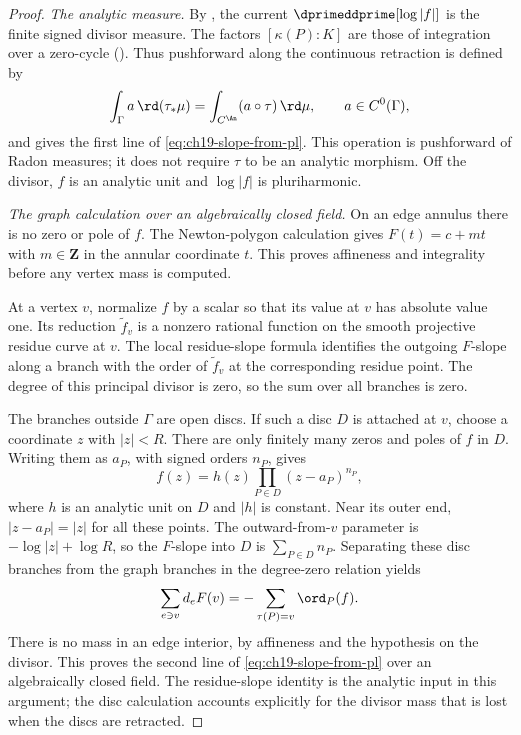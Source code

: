 \begin{proof}
\emph{The analytic measure.}
By , the current
$\dprimeddprime[\log|f|]$ is the finite signed divisor measure.
The factors $[\kappa(P):K]$ are those of integration over a
zero-cycle ().
Thus pushforward along the continuous retraction is defined by
\[
             \int_\Gamma a\,\rd(\tau_*\mu)
                  =\int_{C^{\An}}(a\circ\tau)\,\rd\mu,
             \qquad a\in C^0(\Gamma),
\]
and gives the first line of \eqref{eq:ch19-slope-from-pl}.
This operation is pushforward of Radon measures; it does not require
$\tau$ to be an analytic morphism.
Off the divisor, $f$ is an analytic unit and $\log|f|$ is
pluriharmonic.

\emph{The graph calculation over an algebraically closed field.}
On an edge annulus there is no zero or pole of $f$.
The Newton-polygon calculation
\cite[Proposition~2.10]{BPR13Structure} gives
$F(t)=c+mt$ with $m\in\mathbf Z$ in the annular coordinate $t$.
This proves affineness and integrality before any vertex mass is
computed.

At a vertex $v$, normalize $f$ by a scalar so that its value at $v$
has absolute value one.  Its reduction $\widetilde f_v$ is a
nonzero rational function on the smooth projective residue curve
at $v$.  The local residue-slope formula
\cite[Theorem~5.15(3)]{BPR13Structure} identifies the outgoing
$F$-slope along a branch with the order of $\widetilde f_v$ at
the corresponding residue point.  The degree of this principal
divisor is zero, so the sum over all branches is zero.

The branches outside $\Gamma$ are open discs.  If such a disc $D$
is attached at $v$, choose a coordinate $z$ with $|z|<R$.
There are only finitely many zeros and poles of $f$ in $D$.
Writing them as $a_P$, with signed orders $n_P$, gives
\[
              f(z)=h(z)\prod_{P\in D}(z-a_P)^{n_P},
\]
where $h$ is an analytic unit on $D$ and $|h|$ is constant.
Near its outer end, $|z-a_P|=|z|$ for all these points.
The outward-from-$v$ parameter is $-\log|z|+\log R$, so the
$F$-slope into $D$ is $\sum_{P\in D}n_P$.
Separating these disc branches from the graph branches in the
degree-zero relation yields
\[
             \sum_{e\ni v}d_eF(v)
                  =-\sum_{\tau(P)=v}\ord_P(f).
\]
There is no mass in an edge interior, by affineness and the
hypothesis on the divisor.  This proves the second line of
\eqref{eq:ch19-slope-from-pl} over an algebraically closed field.
The residue-slope identity is the analytic input in this argument;
the disc calculation accounts explicitly for the divisor mass
that is lost when the discs are retracted.


\end{proof}
